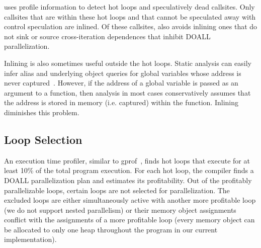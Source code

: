 \name uses profile information to detect hot loops and speculatively
dead callsites. Only callsites that are within these hot loops and
that cannot be speculated away with control speculation are inlined.
%
Of these callsites, \name also avoids inlining ones that do not
sink or source cross-iteration dependences that inhibit DOALL
parallelization.
%

Inlining is also sometimes useful outside the hot loops.
%
Static analysis can easily infer alias and underlying object queries
for global variables whose address is never
captured~\cite{johnson:14:pldi}. However, if the address of a global
variable is passed as an argument to a function, then analysis in
most cases conservatively assumes that the address is stored in memory
(i.e. captured) within the function. Inlining diminishes this
problem.


\subsection{Loop Selection} An execution time profiler, similar to
gprof~\cite{gnu:binutils:web}, finds hot loops that execute for at least 10\%
of the total program execution.
%
For each hot loop, the compiler finds a DOALL parallelization plan and
estimates its profitability.
%
Out of the profitably parallelizable loops, certain loops are not
selected for parallelization. The excluded loops are either
simultaneously active with another more profitable loop (we do not
support nested parallelism) or their memory object assignments
conflict with the assignments of a more profitable loop (every memory
object can be allocated to only one heap throughout the program in our
current implementation).



